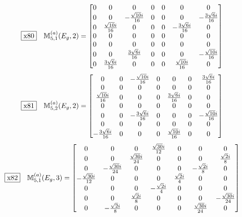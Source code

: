 \documentclass[fleqn,10pt,landscape]{jsarticle}
\begin{document}
\begin{dmath*}
\fbox{x80}\quad \mathbb{M}_{5,1}^{(a)}(E_{g},2)=\begin{bmatrix} 0 & 0 & 0 & 0 & 0 & 0 & 0 \\ 0 & 0 & - \frac{\sqrt{10} i}{16} & 0 & 0 & 0 & - \frac{3 \sqrt{6} i}{16} \\ 0 & \frac{\sqrt{10} i}{16} & 0 & 0 & 0 & - \frac{3 \sqrt{6} i}{16} & 0 \\ 0 & 0 & 0 & 0 & 0 & 0 & 0 \\ 0 & 0 & 0 & 0 & 0 & 0 & 0 \\ 0 & 0 & \frac{3 \sqrt{6} i}{16} & 0 & 0 & 0 & - \frac{\sqrt{10} i}{16} \\ 0 & \frac{3 \sqrt{6} i}{16} & 0 & 0 & 0 & \frac{\sqrt{10} i}{16} & 0 \end{bmatrix}
\end{dmath*}
\begin{dmath*}
\fbox{x81}\quad \mathbb{M}_{5,2}^{(a)}(E_{g},2)=\begin{bmatrix} 0 & 0 & - \frac{\sqrt{10} i}{16} & 0 & 0 & 0 & \frac{3 \sqrt{6} i}{16} \\ 0 & 0 & 0 & 0 & 0 & 0 & 0 \\ \frac{\sqrt{10} i}{16} & 0 & 0 & 0 & \frac{3 \sqrt{6} i}{16} & 0 & 0 \\ 0 & 0 & 0 & 0 & 0 & 0 & 0 \\ 0 & 0 & - \frac{3 \sqrt{6} i}{16} & 0 & 0 & 0 & - \frac{\sqrt{10} i}{16} \\ 0 & 0 & 0 & 0 & 0 & 0 & 0 \\ - \frac{3 \sqrt{6} i}{16} & 0 & 0 & 0 & \frac{\sqrt{10} i}{16} & 0 & 0 \end{bmatrix}
\end{dmath*}
\begin{dmath*}
\fbox{x82}\quad \mathbb{M}_{5,1}^{(a)}(E_{g},3)=\begin{bmatrix} 0 & 0 & 0 & \frac{\sqrt{30} i}{12} & 0 & 0 & 0 \\ 0 & 0 & \frac{\sqrt{30} i}{24} & 0 & 0 & 0 & \frac{\sqrt{2} i}{8} \\ 0 & - \frac{\sqrt{30} i}{24} & 0 & 0 & 0 & - \frac{\sqrt{2} i}{8} & 0 \\ - \frac{\sqrt{30} i}{12} & 0 & 0 & 0 & \frac{\sqrt{2} i}{4} & 0 & 0 \\ 0 & 0 & 0 & - \frac{\sqrt{2} i}{4} & 0 & 0 & 0 \\ 0 & 0 & \frac{\sqrt{2} i}{8} & 0 & 0 & 0 & - \frac{\sqrt{30} i}{24} \\ 0 & - \frac{\sqrt{2} i}{8} & 0 & 0 & 0 & \frac{\sqrt{30} i}{24} & 0 \end{bmatrix}
\end{dmath*}
\end{document}
